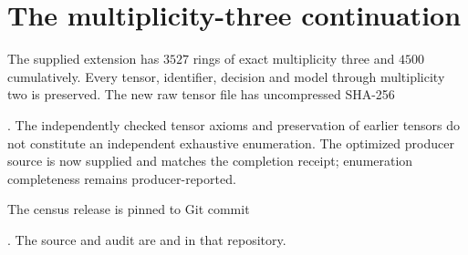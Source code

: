 \section{The multiplicity-three continuation}
\label{sec:m3-continuation}
The supplied extension has $3527$ rings of exact multiplicity three and
$4500$ cumulatively. Every tensor, identifier, decision and model through multiplicity two
is preserved. The new raw tensor file has uncompressed SHA-256
\par\noindent{}.
The independently checked tensor axioms and preservation of earlier tensors
do not constitute an independent exhaustive enumeration. The optimized
producer source is now supplied and matches the completion receipt;
enumeration completeness remains producer-reported.

The census release is pinned to Git commit
\par\noindent{}.
The source and audit are  and  in that repository.

